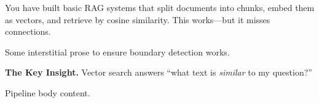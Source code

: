 \begin{tcolorbox}[narrativebox, title=Where We Are]
    You have built basic RAG systems that split documents into chunks, embed
    them as vectors, and retrieve by cosine similarity. This works---but it
    misses connections.
\end{tcolorbox}

Some interstitial prose to ensure boundary detection works.

\begin{tcolorbox}[conceptbox]
    \textbf{The Key Insight.}
    Vector search answers ``what text is \emph{similar} to my question?''
\end{tcolorbox}

\begin{tcolorbox}[pipelinebox, title={Pipeline: Knowledge Graph Applications}]
    Pipeline body content.
\end{tcolorbox}
